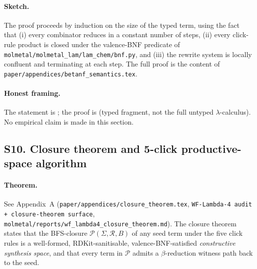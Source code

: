 \paragraph{Sketch.}
The proof proceeds by induction on the size of the typed term, using
the fact that (i) every combinator reduces in a constant number of
steps, (ii) every click-rule product is closed under the
valence-BNF predicate of \texttt{molmetal/molmetal\_lam/lam\_chem/bnf.py},
and (iii) the rewrite system is locally confluent and terminating at
each step.  The full proof is the content of
\texttt{paper/appendices/betanf\_semantics.tex}.

\paragraph{Honest framing.}
The statement is \DESIGN{}; the proof is \DESIGN{} (typed fragment,
not the full untyped $\lambda$-calculus).  No empirical claim is made
in this section.


\subsection*{S10. Closure theorem and 5-click productive-space algorithm}
\label{supp:s10-closure}

\paragraph{Theorem.}
See Appendix~A (\texttt{paper/appendices/closure\_theorem.tex},
\texttt{WF-Lambda-4 audit + closure-theorem surface},
\texttt{molmetal/reports/wf\_lambda4\_closure\_theorem.md}).
The closure theorem states that the BFS-closure
$\mathcal{P}(\Sigma, \mathcal{R}, B)$ of any seed term under the five
click rules is a well-formed, RDKit-sanitisable, valence-BNF-satisfied
\emph{constructive synthesis space}, and that every term in
$\mathcal{P}$ admits a $\beta$-reduction witness path back to the seed.

